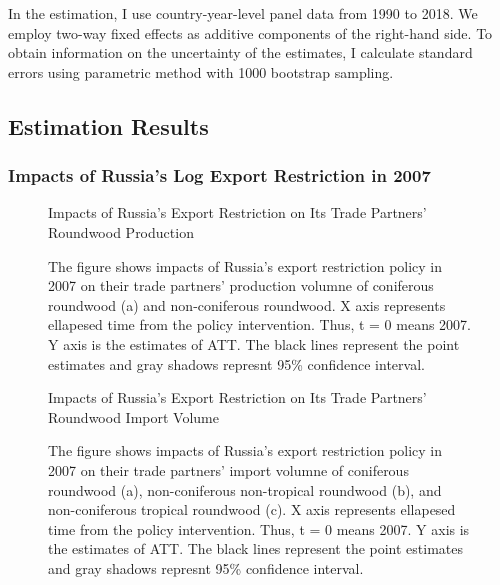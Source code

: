 \documentclass[a4paper,12pt]{article}
\begin{document}
In the estimation, I use country-year-level panel data from 1990 to 2018. We employ two-way fixed effects as additive components of the right-hand side. To obtain information on the uncertainty of the estimates, I calculate standard errors using parametric method with 1000 bootstrap sampling.

\subsection{Estimation Results}
\subsubsection*{Impacts of Russia's Log Export Restriction in 2007}

\begin{figure}[H] 
    \centering
    \caption{Impacts of Russia's Export Restriction on Its Trade Partners' Roundwood Production}
    \caption*{\small{The figure shows impacts of Russia's export restriction policy in 2007 on their trade partners' production volumne of coniferous roundwood (a) and non-coniferous roundwood. X axis represents ellapesed time from the policy intervention. Thus, t = 0 means 2007. Y axis is the estimates of ATT. The black lines represent the point estimates and gray shadows represnt 95\% confidence interval.}}
    \label{fig:att_prod_Russia}
\end{figure}

\begin{figure}[H] 
    \centering
    \caption{Impacts of Russia's Export Restriction on Its Trade Partners' Roundwood Import Volume}
    \caption*{\small{The figure shows impacts of Russia's export restriction policy in 2007 on their trade partners' import volumne of coniferous roundwood (a), non-coniferous non-tropical roundwood (b), and non-coniferous tropical roundwood (c). X axis represents ellapesed time from the policy intervention. Thus, t = 0 means 2007. Y axis is the estimates of ATT. The black lines represent the point estimates and gray shadows represnt 95\% confidence interval.}}
    \label{fig:att_imp_Russia}
\end{figure}
\end{document}

